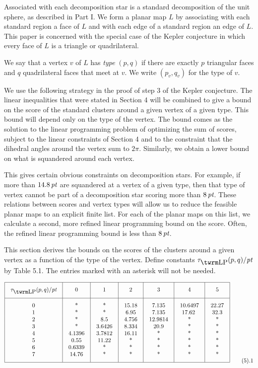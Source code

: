 Associated with each decomposition star is a standard decomposition
of the unit sphere, as described in Part I.  We form
a planar map $L$ by associating with each standard region a face of $L$
and with each edge of a standard region an edge of $L$.
This paper is concerned with the special case of the Kepler
conjecture in which every face of $L$ is a triangle or quadrilateral.

We say that a vertex $v$ of $L$ has {\it type\/} $(p,q)$ if there
are exactly $p$ triangular faces and $q$ quadrilateral faces
that meet at $v$. We write $(p_v,q_v)$ for the type of $v$.

We use the following strategy in the proof of step 3 of the
Kepler conjecture.  The linear inequalities that were stated
in Section 4 will be combined to give a bound on the score of
the standard clusters around a given vertex of a given type.
This bound will depend only on the type of the vertex.
The bound comes as the solution to the linear programming
problem of optimizing
the sum of scores, subject to the linear constraints of Section 4
and to the constraint that the dihedral angles around the vertex
sum to $2\pi$.  Similarly, we obtain a lower bound on what is
squandered around each vertex.  

This gives certain obvious
constraints on decomposition stars.  For example, if more than
$14.8\,\pt$ are squandered at a vertex of a given type,
then that type of vertex cannot be part of a decomposition star
scoring more than $8\,\pt$.  These relations between
scores and vertex types 
will allow us to reduce the feasible planar maps to an
explicit finite list.
For each of the planar maps on this list, we calculate
a second, more refined linear programming bound on the
score.
Often, the refined linear programming bound is less than $8\,\pt$.

This section derives the bounds on the scores of the
clusters around a given vertex as a function of the
type of the vertex.  Define constants 
$\tlp(p,q)/\pt$ by Table 5.1.  The entries marked with an asterisk will
not be needed.

\bigskip


\def\pt{\hbox{\it pt}}

$$
\vbox{\offinterlineskip
\hrule
\halign{&\vrule#&\strut\quad\hfil#\hfil\quad\cr
height 7pt&\omit&&\omit&&\omit&&\omit&&\omit&&\omit&&\omit&\cr
&\hfil $\tlp(p,q)/\pt$\hfil
        &&\hfil0\hfil
        &&\hfil1\hfil
        &&\hfil2\hfil
        &&\hfil3\hfil
        &&\hfil4\hfil
        &&\hfil5\hfil&
\cr
height 7pt&\omit&&\omit&&\omit&&\omit&&\omit&&\omit&&\omit&\cr
\noalign{\hrule}
height7pt&\omit&&\omit&&\omit&&\omit&&\omit&&\omit&&\omit&\cr
&0&&	*&&	*&&	15.18&& 7.135&& 10.6497&& 22.27&\cr
&1&&	*&& *&&  6.95&& 7.135&&17.62  && 32.3&\cr
&2&&	*&& 8.5&&4.756&&12.9814&&*&&*&\cr
&3&&	*&& 3.6426&&8.334&&20.9&&*&&*&\cr
&4&&4.1396&&3.7812&&16.11&&*&&*&&*&\cr
&5&&0.55&&11.22&&*&&*&&*&&*&\cr
&6&&0.6339&&*&&*&&*&&*&&*&\cr
&7&&14.76&&*&&*&&*&&*&&*&\cr
height7pt&\omit&&\omit&&\omit&&\omit&&\omit&&\omit&&\omit&\cr}
\hrule
}\tag 5.1
$$

